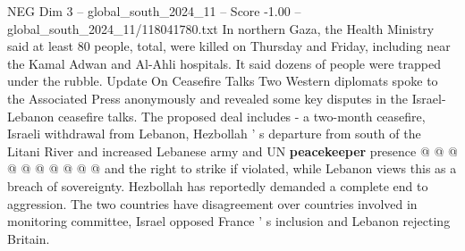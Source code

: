 \begin{textsample}{NEG Dim 3 – global\_south\_2024\_11 – Score -1.00 – global\_south\_2024\_11/118041780.txt}
In northern Gaza, the Health Ministry said at least 80 people, total, were killed on Thursday and Friday, including near the Kamal Adwan and Al-Ahli hospitals.
It said dozens of people were trapped under the rubble.
Update On Ceasefire Talks Two Western diplomats spoke to the Associated Press anonymously and revealed some key disputes in the Israel-Lebanon ceasefire talks.
The proposed deal includes - a two-month ceasefire, Israeli withdrawal from Lebanon, Hezbollah ' s departure from south of the Litani River and increased Lebanese army and UN \textbf{peacekeeper} presence @ @ @ @ @ @ @ @ @ @ and the right to strike if violated, while Lebanon views this as a breach of sovereignty.
Hezbollah has reportedly demanded a complete end to aggression.
The two countries have disagreement over countries involved in monitoring committee, Israel opposed France ' s inclusion and Lebanon rejecting Britain.

\end{textsample}
